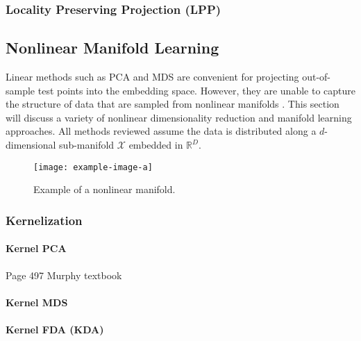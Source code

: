 \subsubsection{Locality Preserving Projection (LPP)}



\subsection{Nonlinear Manifold Learning}

Linear methods such as PCA and MDS are convenient for projecting out-of-sample test points into the embedding space.  However, they are unable to capture the structure of data that are sampled from nonlinear manifolds \citep{Kegl2008PrincipalManifoldsTextbook}. This section will discuss a variety of nonlinear dimensionality reduction and manifold learning approaches.  All methods reviewed assume the data is distributed along a $d$-dimensional sub-manifold $\mathcal{X}$ embedded in $\mathbb{R}^{D}$.

\begin{center}
	\begin{figure*}[h]
		\centering
		\texttt{[image: example-image-a]}
		\caption[Example of a nonlinear manifold.]{Example of a nonlinear manifold.}
		\label{fig:nonlinear_manifold}
	\end{figure*}
\end{center}

\subsubsection{Kernelization}

\paragraph{Kernel PCA}

Page 497 Murphy textbook

\paragraph{Kernel MDS}

\paragraph{Kernel FDA (KDA)}


